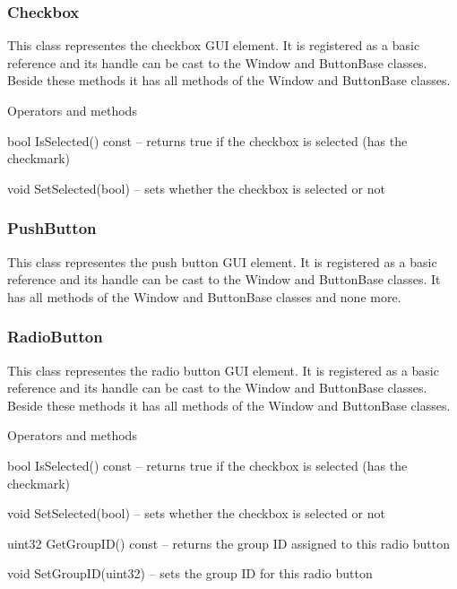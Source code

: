 \subsubsection{Checkbox}

This class representes the checkbox GUI element. It is registered as a basic reference and its handle can be cast to the Window and ButtonBase classes. Beside these methods it has all methods of the Window and ButtonBase classes.

\begin{titled-itemize}{Operators and methods}
  \item bool IsSelected() const -- returns true if the checkbox is selected (has the checkmark)
  \item void SetSelected(bool) -- sets whether the checkbox is selected or not
\end{titled-itemize}

\subsubsection{PushButton}

This class representes the push button GUI element. It is registered as a basic reference and its handle can be cast to the Window and ButtonBase classes. It has all methods of the Window and ButtonBase classes and none more.

\subsubsection{RadioButton}

This class representes the radio button GUI element. It is registered as a basic reference and its handle can be cast to the Window and ButtonBase classes. Beside these methods it has all methods of the Window and ButtonBase classes.

\begin{titled-itemize}{Operators and methods}
  \item bool IsSelected() const -- returns true if the checkbox is selected (has the checkmark)
  \item void SetSelected(bool) -- sets whether the checkbox is selected or not
  \item uint32 GetGroupID() const -- returns the group ID assigned to this radio button
  \item void SetGroupID(uint32) -- sets the group ID for this radio button
\end{titled-itemize}


